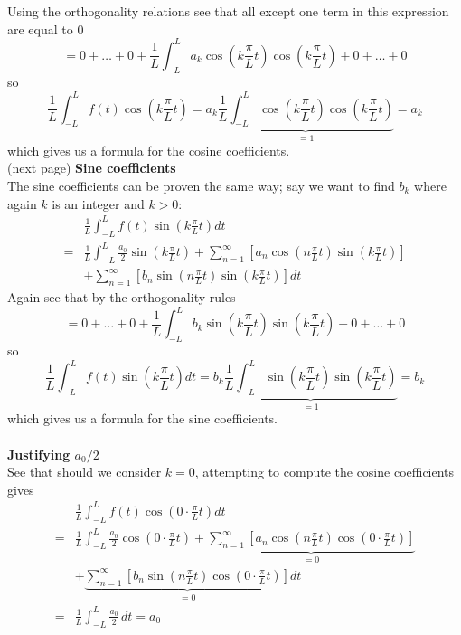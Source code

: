 \documentclass{report}
\begin{document}
Using the orthogonality relations see that all except one  term in this expression are equal to 0 
\begin{equation*}
=0+\ldots+0+\frac{1}{L}\int^L_{-L}a_k\cos\left(k\frac{\pi}{L}t\right)\cos\left(k\frac{\pi}{L}t\right)+0+\ldots+0
\end{equation*}
so
\begin{equation*}
\frac{1}{L}\int^L_{-L}f(t)\cos\left(k\frac{\pi}{L}t\right)
=a_k\underbrace{\frac{1}{L}\int^L_{-L}\cos\left(k\frac{\pi}{L}t\right)\cos\left(k\frac{\pi}{L}t\right)}_{=1}=a_k
\end{equation*}
which gives us a formula for the cosine coefficients.\\
(next page)\newpage
\noindent\textbf{Sine coefficients}\\
The sine coefficients can be proven the same way; say we want to find $b_k$ where again $k$ is an integer and $k>0$:
\begin{align*}
&\frac{1}{L}\int^L_{-L}f(t)\sin\left(k\frac{\pi}{L}t\right)dt\\
=&\frac{1}{L}\int^L_{-L}\frac{a_0}{2}\sin\left(k\frac{\pi}{L}t\right)+\sum^{\infty}_{n=1}\left[a_n\cos\left(n\frac{\pi}{L}t\right)\sin\left(k\frac{\pi}{L}t\right)\right]\\&+
\sum^{\infty}_{n=1}\left[b_n\sin\left(n\frac{\pi}{L}t\right)\sin\left(k\frac{\pi}{L}t\right)\right]dt
\end{align*}
Again see that by the orthogonality rules
\begin{equation*}
=0+\ldots+0+\frac{1}{L}\int^L_{-L}b_k\sin\left(k\frac{\pi}{L}t\right)\sin\left(k\frac{\pi}{L}t\right)+0+\ldots+0
\end{equation*}
so
\begin{equation*}
\frac{1}{L}\int^L_{-L}f(t)\sin\left(k\frac{\pi}{L}t\right)dt=b_k\underbrace{\frac{1}{L}\int^L_{-L}\sin\left(k\frac{\pi}{L}t\right)\sin\left(k\frac{\pi}{L}t\right)}_{=1}=b_k
\end{equation*}
which gives us a formula for the sine coefficients.\\
\vspace{1mm}\\
\textbf{Justifying $a_0/2$}\\
See that should we consider $k=0$, attempting to compute the cosine coefficients gives
\begin{align*}
&\frac{1}{L}\int^L_{-L}f(t)\cos\left(0\cdot\frac{\pi}{L}t\right)dt\\
=&\frac{1}{L}\int^L_{-L}\frac{a_0}{2}\cos\left(0\cdot\frac{\pi}{L}t\right)+
\underbrace{\sum^{\infty}_{n=1}\left[a_n\cos\left(n\frac{\pi}{L}t\right)\cos\left(0\cdot\frac{\pi}{L}t\right)\right]}_{=0}\\&+
\underbrace{\sum^{\infty}_{n=1}\left[b_n\sin\left(n\frac{\pi}{L}t\right)\cos\left(0\cdot\frac{\pi}{L}t\right)\right]}_{=0}dt\\
=&\frac{1}{L}\int^L_{-L}\frac{a_0}{2}\,dt=a_0
\end{align*}
\end{document}
